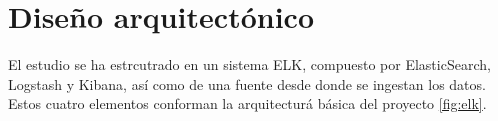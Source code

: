 \paragraph{}
\paragraph{}
\paragraph{}
\paragraph{}
\paragraph{}
\paragraph{}
\paragraph{}
\paragraph{}
\paragraph{}
\paragraph{}
\paragraph{}
\paragraph{}
\paragraph{}


\section{Diseño arquitectónico}

El estudio se ha estrcutrado en un sistema ELK, compuesto por ElasticSearch, Logstash y Kibana, así como de una fuente desde donde se ingestan los datos. Estos cuatro elementos conforman la arquitecturá básica del proyecto \ref{fig:elk}.

